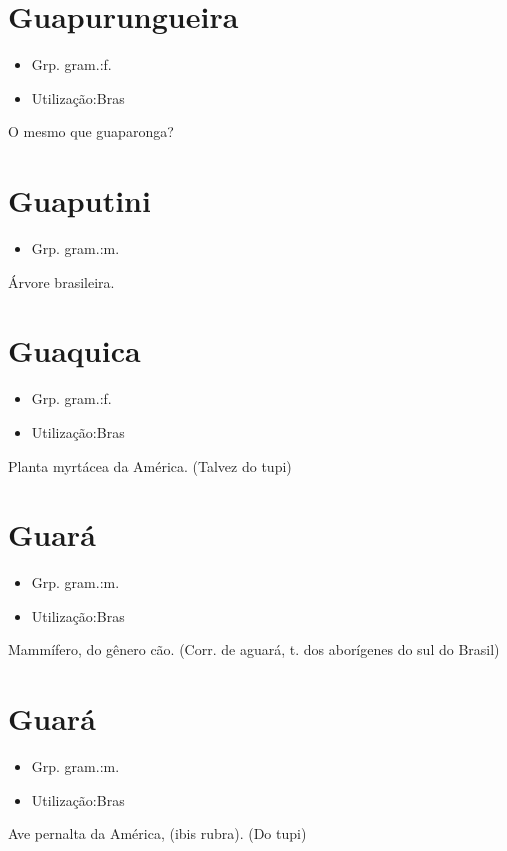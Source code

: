 \section{Guapurungueira}
\begin{itemize}
\item {Grp. gram.:f.}
\end{itemize}
\begin{itemize}
\item {Utilização:Bras}
\end{itemize}
O mesmo que \textunderscore guaparonga\textunderscore ?
\section{Guaputini}
\begin{itemize}
\item {Grp. gram.:m.}
\end{itemize}
Árvore brasileira.
\section{Guaquica}
\begin{itemize}
\item {Grp. gram.:f.}
\end{itemize}
\begin{itemize}
\item {Utilização:Bras}
\end{itemize}
Planta myrtácea da América.
(Talvez do tupi)
\section{Guará}
\begin{itemize}
\item {Grp. gram.:m.}
\end{itemize}
\begin{itemize}
\item {Utilização:Bras}
\end{itemize}
Mammífero, do gênero cão.
(Corr. de \textunderscore aguará\textunderscore , t. dos aborígenes do sul do Brasil)
\section{Guará}
\begin{itemize}
\item {Grp. gram.:m.}
\end{itemize}
\begin{itemize}
\item {Utilização:Bras}
\end{itemize}
Ave pernalta da América, (\textunderscore ibis rubra\textunderscore ).
(Do tupi)
